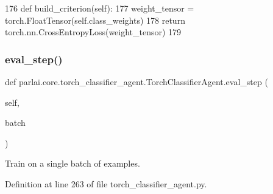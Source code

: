 \begin{DoxyCode}
176     \textcolor{keyword}{def }build\_criterion(self):
177         weight\_tensor = torch.FloatTensor(self.class\_weights)
178         \textcolor{keywordflow}{return} torch.nn.CrossEntropyLoss(weight\_tensor)
179 
\end{DoxyCode}
\mbox{\label{classparlai_1_1core_1_1torch__classifier__agent_1_1TorchClassifierAgent_a5d456df843180fb32ca574dc2a33cc80}} 
\subsubsection{\texorpdfstring{eval\+\_\+step()}{eval\_step()}}
{\footnotesize\ttfamily def parlai.\+core.\+torch\+\_\+classifier\+\_\+agent.\+Torch\+Classifier\+Agent.\+eval\+\_\+step (\begin{DoxyParamCaption}\item[{}]{self,  }\item[{}]{batch }\end{DoxyParamCaption})}

\begin{DoxyVerb}Train on a single batch of examples.
\end{DoxyVerb}
 

Definition at line 263 of file torch\+\_\+classifier\+\_\+agent.\+py.



